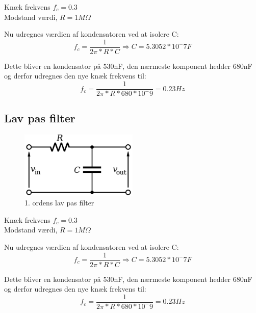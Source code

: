 Knæk frekvens $f_c = 0.3$ \\
Modstand værdi, $R = 1M\Omega$

Nu udregnes værdien af kondensatoren ved at isolere C: 
\begin{equation}
	f_c = \frac{1}{2\pi * R * C} \Rightarrow C = 5.3052 * 10^-7F
\end{equation}


Dette bliver en kondensator på 530nF, den nærmeste komponent hedder 680nF og derfor udregnes den nye knæk frekvens til: 
\begin{equation}
	f_c = \frac{1}{2\pi * R * 680 * 10^-9} = 0.23Hz
\end{equation}



\subsection{Lav pas filter}
\begin{figure}[H]
	\centering
	\includegraphics[width = 0.5\textwidth]{Implementeringsdokument/billeder/LowPass.png}
	\caption{1. ordens lav pas filter}\label{fig:lowpass}
\end{figure}
Knæk frekvens $f_c = 0.3$ \\
Modstand værdi, $R = 1M\Omega$

Nu udregnes værdien af kondensatoren ved at isolere C:
\begin{equation}
	f_c = \frac{1}{2\pi * R * C} \Rightarrow C = 5.3052 * 10^-7F
\end{equation}


Dette bliver en kondensator på 530nF, den nærmeste komponent hedder 680nF og derfor udregnes den nye knæk frekvens til:
\begin{equation}
	 f_c = \frac{1}{2\pi * R * 680 * 10^-9} = 0.23Hz
\end{equation}


\newpage
